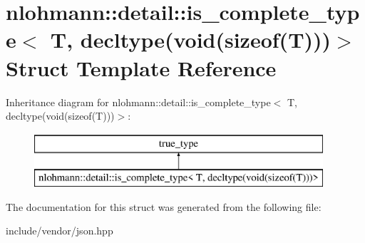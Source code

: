 \hypertarget{structnlohmann_1_1detail_1_1is__complete__type_3_01_t_00_01decltype_07void_07sizeof_07_t_08_08_08_4}{}\section{nlohmann\+:\+:detail\+:\+:is\+\_\+complete\+\_\+type$<$ T, decltype(void(sizeof(T)))$>$ Struct Template Reference}
\label{structnlohmann_1_1detail_1_1is__complete__type_3_01_t_00_01decltype_07void_07sizeof_07_t_08_08_08_4}
Inheritance diagram for nlohmann\+:\+:detail\+:\+:is\+\_\+complete\+\_\+type$<$ T, decltype(void(sizeof(T)))$>$\+:\begin{figure}[H]
\begin{center}
\leavevmode
\includegraphics[height=2.000000cm]{dc/d2b/structnlohmann_1_1detail_1_1is__complete__type_3_01_t_00_01decltype_07void_07sizeof_07_t_08_08_08_4}
\end{center}
\end{figure}


The documentation for this struct was generated from the following file\+:\begin{DoxyCompactItemize}
\item 
include/vendor/json.\+hpp\end{DoxyCompactItemize}
